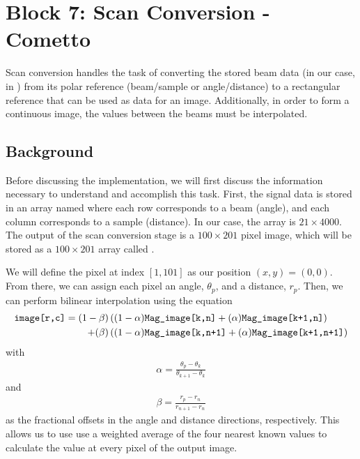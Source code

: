 
\section{Block 7: Scan Conversion - Cometto}

Scan conversion handles the task of converting the stored beam data (in our case, in ) from its polar reference (beam/sample or angle/distance) to a rectangular reference that can be used as data for an image.  Additionally, in order to form a continuous image, the values between the beams must be interpolated.

\subsection{Background}

Before discussing the implementation, we will first discuss the information necessary to understand and accomplish this task.  First, the signal data is stored in an array named  where each row corresponds to a beam (angle), and each column corresponds to a sample (distance).  In our case, the array is $21 \times 4000$.  The output of the scan conversion stage is a $100 \times 201$ pixel image, which will be stored as a $100 \times 201$ array called .

We will define the pixel at index $[1,101]$ as our position $(x,y) = (0,0)$.  From there, we can assign each pixel an angle, $\theta_p$, and a distance, $r_p$.  Then, we can perform bilinear interpolation using the equation
\begin{align*}
    \texttt{image[r,c]} = (1-\beta) &\left( (1 - \alpha) \texttt{Mag\_image[k,n]} + (\alpha) \texttt{Mag\_image[k+1,n]}  \right) \\ 
    + (\beta) &\left( (1-\alpha) \texttt{Mag\_image[k,n+1]} + (\alpha) \texttt{Mag\_image[k+1,n+1]} \right)
\end{align*}
with
\begin{align*}
    \alpha = \frac{\theta_p - \theta_k}{\theta_{k+1} - \theta_k}
\end{align*}
and
\begin{align*}
    \beta = \frac{r_p - r_n}{r_{n+1} - r_n}
\end{align*}
as the fractional offsets in the angle and distance directions, respectively.  This allows us to use use a weighted average of the four nearest known values to calculate the value at every pixel of the output image.

